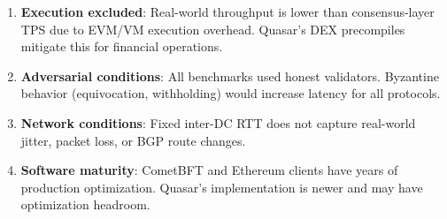 \begin{enumerate}
\item \textbf{Execution excluded}: Real-world throughput is lower than consensus-layer
      TPS due to EVM/VM execution overhead. Quasar's DEX precompiles mitigate this
      for financial operations.
\item \textbf{Adversarial conditions}: All benchmarks used honest validators. Byzantine
      behavior (equivocation, withholding) would increase latency for all protocols.
\item \textbf{Network conditions}: Fixed inter-DC RTT does not capture real-world jitter,
      packet loss, or BGP route changes.
\item \textbf{Software maturity}: CometBFT and Ethereum clients have years of production
      optimization. Quasar's implementation is newer and may have optimization
      headroom.
\end{enumerate}

